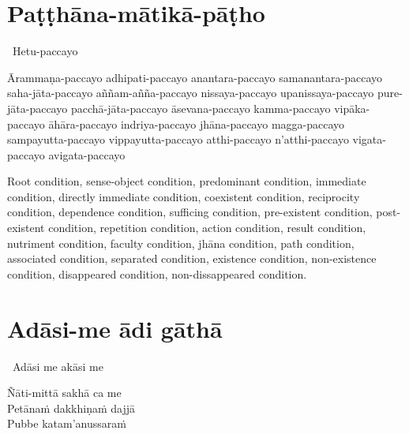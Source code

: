 \suttaRef{[SN 12.1]}

\section{Paṭṭhāna-mātikā-pāṭho}
\label{patthana-matika-patho}

\begin{pali-leader}
  \anglebracketleft\ \hspace{-0.5mm}Hetu-paccayo \hspace{-0.5mm}\anglebracketright\
\end{pali-leader}
\begin{pali-hangtogether}
  Ārammaṇa-paccayo adhipati-paccayo anantara-paccayo samanantara-paccayo saha-jāta-paccayo aññam-añña-paccayo nissaya-paccayo upanissaya-paccayo pure-jāta-paccayo pacchā-jāta-paccayo āsevana-paccayo kamma-paccayo vipāka-paccayo āhāra-paccayo indriya-paccayo jhāna-paccayo magga-paccayo sampayutta-paccayo vippayutta-paccayo atthi-paccayo n'atthi-paccayo vigata-paccayo avigata-paccayo
\end{pali-hangtogether}

\begin{english-hang-verses}
  Root condition, sense-object condition, predominant condition, immediate condition, directly immediate condition, coexistent condition, reciprocity condition, dependence condition, sufficing condition, pre-existent condition, post-existent condition, repetition condition, action condition, result condition, nutriment condition, faculty condition, jhāna condition, path condition, associated condition, separated condition, existence condition, non-existence condition, disappeared condition, non-dissappeared condition.
\end{english-hang-verses}

\suttaRef{[Dhs A]}

\section{Adāsi-me ādi gāthā}
\label{adasi-me-adi-gatha}

\begin{pali-leader}
  \anglebracketleft\ \hspace{-0.5mm}Adāsi me akāsi me \hspace{-0.5mm}\anglebracketright\
\end{pali-leader}
\begin{pali-hangtogether}
  Ñāti-mittā sakhā ca me\\
  Petānaṁ dakkhiṇaṁ dajjā\\
  Pubbe katam'anussaraṁ
\end{pali-hangtogether}

